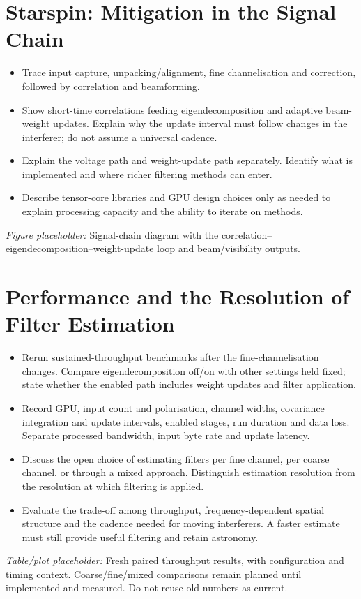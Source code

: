 \documentclass[11pt,twoside]{article}
\begin{document}
\section{Starspin: Mitigation in the Signal Chain}
\begin{itemize}
\item Trace input capture, unpacking/alignment, fine channelisation and
correction, followed by correlation and beamforming.
\item Show short-time correlations feeding eigendecomposition and adaptive
beam-weight updates. Explain why the update interval must follow changes
in the interferer; do not assume a universal cadence.
\item Explain the voltage path and weight-update path separately. Identify
what is implemented and where richer filtering methods can enter.
\item Describe tensor-core libraries and GPU design choices only as needed
to explain processing capacity and the ability to iterate on methods.
\end{itemize}
\noindent\textit{Figure placeholder:} Signal-chain diagram with the
correlation--eigendecomposition--weight-update loop and beam/visibility outputs.

\section{Performance and the Resolution of Filter Estimation}
\begin{itemize}
\item Rerun sustained-throughput benchmarks after the fine-channelisation
changes. Compare eigendecomposition off/on with other settings held fixed;
state whether the enabled path includes weight updates and filter application.
\item Record GPU, input count and polarisation, channel widths, covariance
integration and update intervals, enabled stages, run duration and data loss.
Separate processed bandwidth, input byte rate and update latency.
\item Discuss the open choice of estimating filters per fine channel, per
coarse channel, or through a mixed approach. Distinguish estimation resolution
from the resolution at which filtering is applied.
\item Evaluate the trade-off among throughput, frequency-dependent spatial
structure and the cadence needed for moving interferers. A faster estimate
must still provide useful filtering and retain astronomy.
\end{itemize}
\noindent\textit{Table/plot placeholder:} Fresh paired throughput results,
with configuration and timing context. Coarse/fine/mixed comparisons remain
planned until implemented and measured. Do not reuse old numbers as current.
\end{document}
